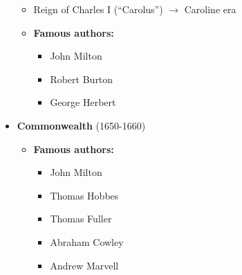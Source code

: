\documentclass[
  12pt,
  ignorenonframetext,
  progressbar=frametitle]{beamer}
\providecommand{\tightlist}{%
  \setlength{\itemsep}{0pt}\setlength{\parskip}{0pt}}
\begin{document}
\begin{frame}[allowframebreaks]
\begin{itemize}
  \begin{itemize}
  \tightlist
  \item
    Reign of Charles I (``Carolus'') \(\rightarrow\) Caroline era
  \item
    \textbf{Famous authors:}

    \begin{itemize}
    \tightlist
    \item
      John Milton
    \item
      Robert Burton
    \item
      George Herbert
    \end{itemize}
  \end{itemize}
\item
  \textbf{Commonwealth} (1650-1660)

  \begin{itemize}
  \tightlist
  \item
    \textbf{Famous authors:}

    \begin{itemize}
    \tightlist
    \item
      John Milton
    \item
      Thomas Hobbes
    \item
      Thomas Fuller
    \item
      Abraham Cowley
    \item
      Andrew Marvell
    \end{itemize}
  \end{itemize}
\end{itemize}
\end{frame}
\end{document}
